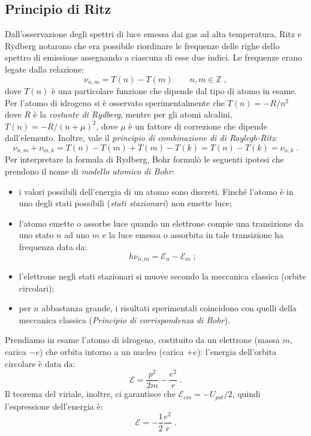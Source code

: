 \documentclass[12pt,a4paper]{report}
\theoremstyle{definition}
\numberwithin{equation}{section}
\begin{document}
\subsection{Principio di Ritz}
Dall'osservazione degli spettri di luce emessa dai gas ad alta temperatura, Ritz e Rydberg notarono che era possibile riordinare le frequenze delle righe dello spettro di emissione assegnando a ciascuna di esse due indici. Le frequenze erano legate dalla relazione:
\begin{equation}
\nu_{n,m}=T(n)-T(m) \qquad n,m\in \mathbb{Z}\;,
\end{equation}
dove $T(n)$ è una particolare funzione che dipende dal tipo di atomo in esame. Per l'atomo di idrogeno si è osservato sperimentalmente che $T(n)=-R/n^2$ dove $R$ è la \textit{costante di Rydberg}, mentre per gli atomi alcalini, $T(n)=-R/(n+\mu)^2$, dove $\mu$ è un fattore di correzione che dipende dall'elemento. Inoltre, vale il \textit{principio di combinazione di di Raylegh-Ritz}:
\begin{equation}
\nu_{n,m}+\nu_{m,k}=T(n)-T(m)+T(m)-T(k)=T(n)-T(k)=\nu_{n,k}\;.
\end{equation}
Per interpretare la formula di Rydberg, Bohr formulò le seguenti ipotesi che prendono il nome di \textit{modello atomico di Bohr}:
\begin{itemize}
\item i valori possibili dell'energia di un atomo sono discreti. Finché l'atomo è in uno degli stati possibili (\textit{stati stazionari}) non emette luce;
\item l'atomo emette o assorbe luce quando un elettrone compie una transizione da uno stato $n$ ad uno $m$ e la luce emessa o assorbita in tale transizione ha frequenza data da:
$$
h\nu_{n,m}=\mathcal{E}_n-\mathcal{E}_m\;;
$$
\item l'elettrone negli stati stazionari si muove secondo la meccanica classica (orbite circolari);
\item per $n$ abbastanza grande, i risultati sperimentali coincidono con quelli della meccanica classica (\textit{Principio di corrispondenza di Bohr}).
\end{itemize}
Prendiamo in esame l'atomo di idrogeno, costituito da un elettrone (massa $m$, carica $-e$) che orbita intorno a un nucleo (carica $+e$): l'energia dell'orbita circolare è data da:
$$
\mathcal{E}=\frac{p^2}{2m}-\frac{e^2}{r}\;.
$$
Il teorema del viriale, inoltre, ci garantisce che $\mathcal{E}_{cin}=-U_{pot}/2$, quindi l'espressione dell'energia è:
\begin{equation}
\mathcal{E}=-\frac{1}{2}\frac{e^2}{r}\;. \label{ch1_energy}
\end{equation}
\end{document}
